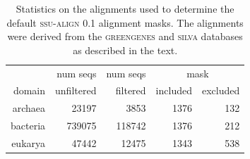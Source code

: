 %
%
%
%
%
% 
% 
\begin{table}[hb]
\begin{center}
\begin{tabular}{r|rr|rr}
         & num seqs   & num seqs & \multicolumn{2}{c}{mask} \\ \cline{4-5}
domain   & unfiltered & filtered & included & excluded \\ \hline
archaea  & 23197      & 3853     & 1376     & 132 \\
bacteria & 739075     & 118742   & 1376     & 212 \\
eukarya  & 47442      & 12475    & 1343     & 538 \\ 
\end{tabular}
\caption{Statistics on the alignments used to determine the default
  \textsc{ssu-align} 0.1 alignment masks. The alignments were derived
  from the \textsc{greengenes} \cite{DeSantis06} and \textsc{silva}
  \cite{Pruesse07} databases as described in the text.}
\label{tbl:ggsil}
\end{center}
\end{table}

